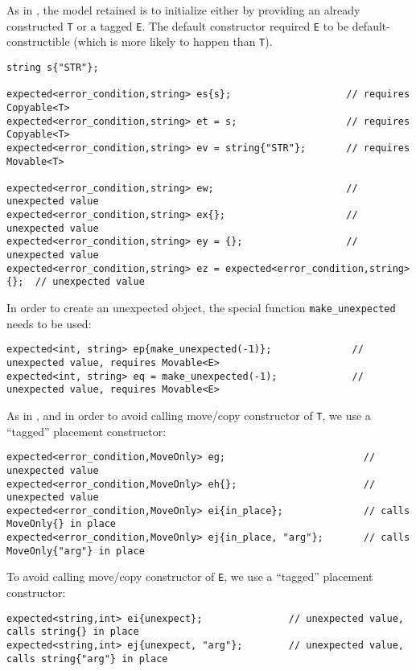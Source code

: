 \documentclass[a4paper,10pt]{article}
\newcommand{\cpp}[1]{\lstinline{#1}}
\begin{document}
\noindent
As in \cite{OptionalRev4}, the model retained is to initialize either by providing an already constructed \cpp{T} or a tagged \cpp{E}. The default constructor required \cpp{E} to be default-constructible (which is more likely to happen than \cpp{T}).

\begin{lstlisting}
string s{"STR"};

expected<error_condition,string> es{s};                    // requires Copyable<T>
expected<error_condition,string> et = s;                   // requires Copyable<T>
expected<error_condition,string> ev = string{"STR"};       // requires Movable<T>

expected<error_condition,string> ew;                       // unexpected value
expected<error_condition,string> ex{};                     // unexpected value
expected<error_condition,string> ey = {};                  // unexpected value
expected<error_condition,string> ez = expected<error_condition,string>{};  // unexpected value
\end{lstlisting}

\noindent
In order to create an unexpected object, the special function \cpp{make_unexpected} needs to be used:

\begin{lstlisting}
expected<int, string> ep{make_unexpected(-1)};              // unexpected value, requires Movable<E>
expected<int, string> eq = make_unexpected(-1);             // unexpected value, requires Movable<E>
\end{lstlisting}

\noindent
As in \cite{OptionalRev4}, and in order to avoid calling move/copy constructor of \cpp{T}, we use a ``tagged'' placement constructor: 

\begin{lstlisting}
expected<error_condition,MoveOnly> eg;                        // unexpected value
expected<error_condition,MoveOnly> eh{};                      // unexpected value
expected<error_condition,MoveOnly> ei{in_place};              // calls MoveOnly{} in place
expected<error_condition,MoveOnly> ej{in_place, "arg"};       // calls MoveOnly{"arg"} in place
\end{lstlisting}

\noindent
To avoid calling move/copy constructor of \cpp{E}, we use a ``tagged'' placement constructor: 

\begin{lstlisting}
expected<string,int> ei{unexpect};               // unexpected value, calls string{} in place
expected<string,int> ej{unexpect, "arg"};        // unexpected value, calls string{"arg"} in place
\end{lstlisting}
\end{document}
